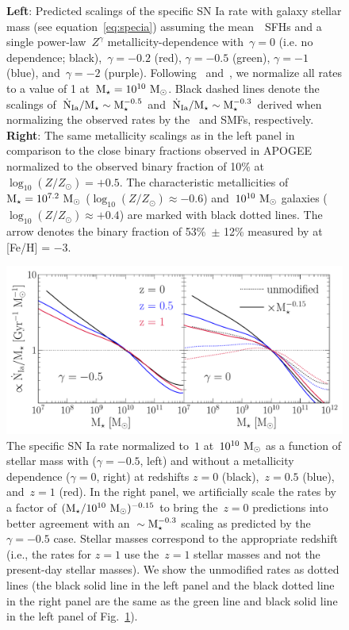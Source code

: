 \documentclass[foo.tex]{subfiles}
\begin{document}
\begin{figure}
\caption{
\textbf{Left}: Predicted scalings of the specific SN Ia rate with galaxy
stellar mass (see equation~\ref{eq:specia}) assuming the mean~\um~SFHs and a
single power-law~$Z^\gamma$ metallicity-dependence with~$\gamma = 0$ (i.e. no
dependence; black),~$\gamma = -0.2$ (red), $\gamma = -0.5$ (green),
$\gamma = -1$ (blue), and~$\gamma = -2$ (purple).
Following~\citet{Brown2019} and~\citet{Gandhi2022}, we normalize all rates to
a value of 1 at~$\text{M}_\star = 10^{10}~\text{M}_\odot$.
Black dashed lines denote the scalings of~$\dot{\text{N}}_\text{Ia} / \text{M}_\star
\sim \text{M}_\star^{-0.5}$ and~$\dot{\text{N}}_\text{Ia} / \text{M}_\star \sim \text{M}_\star^{-0.3}$
derived when normalizing the observed rates by the~\citet{Bell2003} and
\citet{Baldry2012} SMFs, respectively.
\textbf{Right}: The same metallicity scalings as in the left panel in
comparison to the close binary fractions observed in APOGEE
\citep[][black dashed line with error bars]{Moe2019} normalized to the observed
binary fraction of 10\% at~$\log_{10}(Z / Z_\odot) = +0.5$.
The characteristic metallicities of~$\text{M}_\star = 10^{7.2}~\text{M}_\odot$
($\log_{10}(Z / Z_\odot) \approx -0.6$) and~$10^{10}~\text{M}_\odot$ galaxies 
($\log_{10}(Z / Z_\odot) \approx +0.4$) are marked with black dotted lines.
The arrow denotes the binary fraction of 53\%~$\pm$ 12\% measured by
\citet{Moe2019} at [Fe/H] = $-3$.
}
\label{fig:specia_metdep}
\end{figure}

\begin{figure}
\centering
\includegraphics[scale = 0.65]{umachine_iarate_redshiftevol.pdf}
\caption{
The specific SN Ia rate normalized to~$1$ at~$10^{10}~\text{M}_\odot$ as a function of
stellar mass with ($\gamma = -0.5$, left) and without a metallicity dependence
($\gamma = 0$, right) at redshifts $z = 0$ (black),~$z = 0.5$ (blue),
and~$z = 1$ (red).
In the right panel, we artificially scale the rates by a factor of
$(\text{M}_\star / 10^{10}~\text{M}_\odot)^{-0.15}$ to bring the~$z = 0$ predictions into
better agreement with an~$\sim \text{M}_\star^{-0.3}$ scaling as predicted by the
$\gamma = -0.5$ case.
Stellar masses correspond to the appropriate redshift (i.e., the rates for
$z = 1$ use the~$z = 1$ stellar masses and not the present-day stellar
masses).
We show the unmodified rates as dotted lines (the black solid line in the left
panel and the black dotted line in the right panel are the same as the green
line and black solid line in the left panel of Fig.~\ref{fig:specia_metdep}).
}
\label{fig:specia_zdep}
\end{figure}
\end{document}
